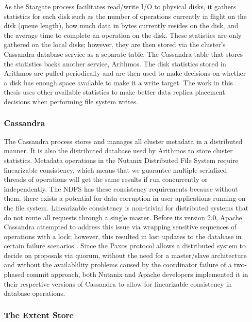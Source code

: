\documentclass[12pt]{article}
\begin{document}
    As the Stargate process facilitates read/write I/O to physical disks, it
    gathers statistics for each disk such as the number of operations currently
    in flight on the disk (queue length), how much data in bytes currently
    resides on the disk, and the average time to complete an operation on the
    disk. These statistics are only gathered on the local disks; however, they
    are then stored via the cluster's Cassandra database service as a separate
    table. The Cassandra table that stores the statistics backs another
    service, Arithmos. The disk statistics stored in Arithmos are pulled
    periodically and are then used to make decisions on whether a disk has
    enough space available to make it a write target. The work in this thesis
    uses other available statistics to make better data replica placement
    decisions when performing file system writes.

    \subsubsection{Cassandra}

    The Cassandra process stores and manages all cluster metadata in a
    distributed manner. It is also the distributed database used by Arithmos to
    store cluster statistics. Metadata operations in the Nutanix Distributed File System
    require linearizable consistency, which means that we guarantee multiple
    serialized threads of operations will get the same results if run
    concurrently or independently. The NDFS has these consistency
    requirements because without them, there exists a potential for data corruption in user
    applications running on the file system. Linearizable consistency is
    non-trivial for distributed systems that do not route all requests through
    a single master. Before its version 2.0, Apache Cassandra attempted to
    address this issue via wrapping sensitive sequences of operations with a
    lock; however, this resulted in lost updates to the database in certain
    failure scenarios \cite{ellis2013lightweight}. Since the Paxos protocol
    allows a distributed system to decide on proposals via quorum, without the
    need for a master/slave architecture and without the availablility problems
    caused by the coordinator failure of a two-phased commit approach, both
    Nutanix and Apache developers implemented it in their respective versions
    of Cassandra to allow for linearizable consistency in database operations.

    \subsubsection{The Extent Store}
\end{document}
